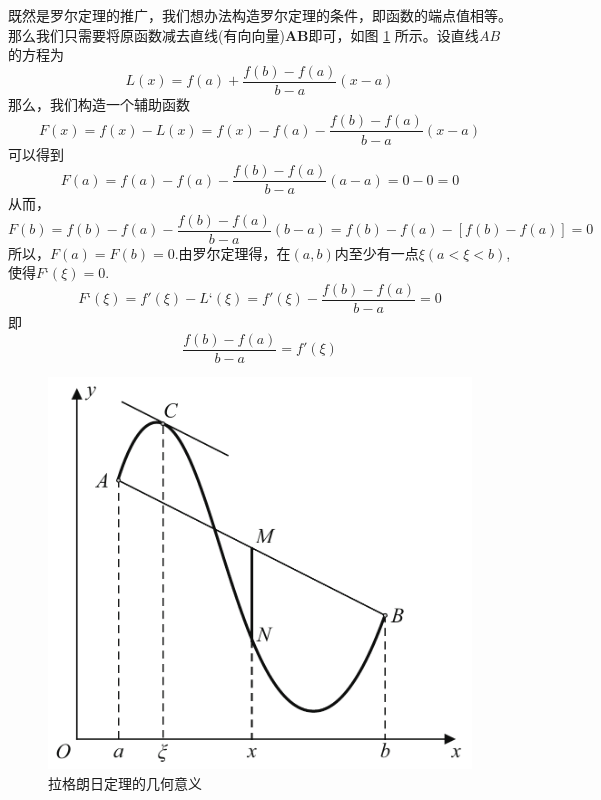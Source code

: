 \noindent \proof 既然是罗尔定理的推广，我们想办法构造罗尔定理的条件，即函数的端点值相等。那么我们只需要将原函数减去直线(有向向量)$\bm{AB}$即可，如图 \ref{Lagrange} 所示。设直线$AB$的方程为
\begin{equation}
	\nonumber
	L(x)=f(a)+\frac{f(b)-f(a)}{b-a}(x-a)
\end{equation}
那么，我们构造一个辅助函数
\begin{equation}
	\nonumber
	F(x)=f(x)-L(x)=f(x)-f(a)-\frac{f(b)-f(a)}{b-a}(x-a)
\end{equation}
可以得到
\begin{equation}
\nonumber
	F(a)=f(a)-f(a)-\frac{f(b)-f(a)}{b-a}(a-a)=0-0=0
\end{equation}
从而，
\begin{equation}
	\nonumber
	F(b)=f(b)-f(a)-\frac{f(b)-f(a)}{b-a}(b-a)=f(b)-f(a)-[f(b)-f(a)]=0
\end{equation}
所以，$F(a)=F(b)=0$.由罗尔定理得，在$(a,b)$内至少有一点$\xi(a<\xi<b)$,使得$F‘(\xi)=0$.
\begin{equation}
	\nonumber
	F‘(\xi)=f'(\xi)-L‘(\xi)=f'(\xi)-\frac{f(b)-f(a)}{b-a}=0
\end{equation}
即\begin{equation}
	\nonumber
	\frac{f(b)-f(a)}{b-a}=f'(\xi)
\end{equation}

\begin{figure}[!htb]
	\centering
	\includegraphics[width = 0.51\linewidth]{pic/C-2/Lagrange}
	\vspace*{-1em}
	\caption{拉格朗日定理的几何意义}
	\label{Lagrange}
\end{figure}

\vspace*{3em}

